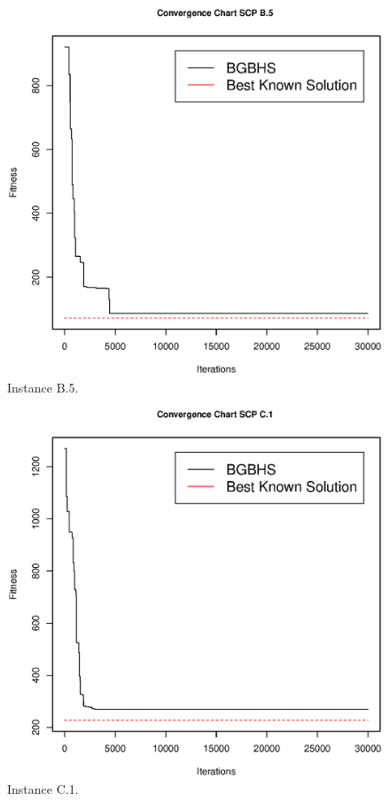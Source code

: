 \begin{figure}[]
\centering
\includegraphics[scale=.45]{Resultados/scpB5.eps}
\caption{Instance B.5.}
\label{fig:Instance.B.5}
\end{figure}

\begin{figure}[]
\centering
\includegraphics[scale=.45]{Resultados/scpC1.eps}
\caption{Instance C.1.}
\label{fig:Instance.C.1}
\end{figure}

